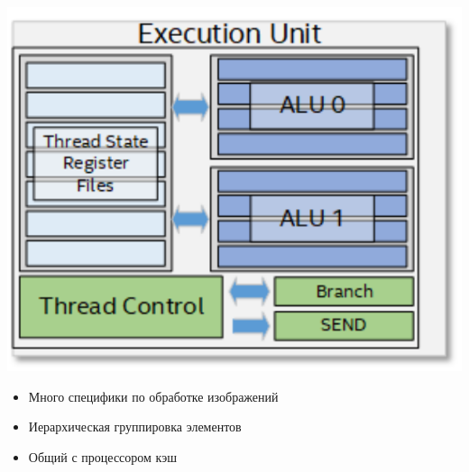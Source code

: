 \documentclass[xcolor=table,aspectratio=169]{beamer}
\begin{document}
\begin{frame}[fragile]
\begin{minipage}[t]{0.27\textwidth}
  \includegraphics[valign=b,width=\textwidth]{pictures/intel_execution_unit_crp.pdf}
  \end{minipage}
  \begin{minipage}[t]{0.37\textwidth}
    \begin{itemize}
      \item Много специфики по обработке изображений
      \item Иерархическая группировка элементов
      \item Общий с процессором кэш
    \end{itemize}
    \end{minipage}
\end{frame}
\end{document}
